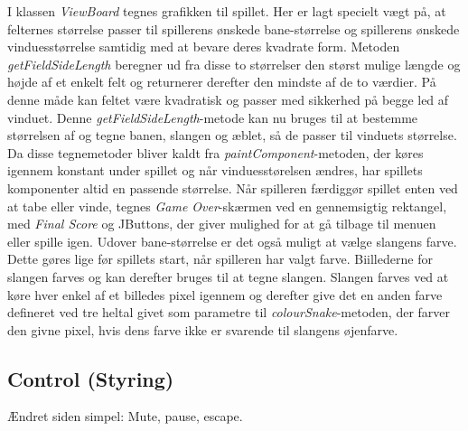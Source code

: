 \documentclass{report}
\begin{document}
I klassen \textit{ViewBoard} tegnes grafikken til spillet. Her er lagt specielt vægt på, at felternes størrelse passer til spillerens ønskede bane-størrelse og spillerens ønskede vinduesstørrelse samtidig med at bevare deres kvadrate form. Metoden \textit{getFieldSideLength} beregner ud fra disse to størrelser den størst mulige længde og højde af et enkelt felt og returnerer derefter den mindste af de to værdier. På denne måde kan feltet være kvadratisk og passer med sikkerhed på begge led af vinduet. Denne \textit{getFieldSideLength}-metode kan nu bruges til at bestemme størrelsen af og tegne banen, slangen og æblet, så de passer til vinduets størrelse. Da disse tegnemetoder bliver kaldt fra \textit{paintComponent}-metoden, der køres igennem konstant under spillet og når vinduesstørelsen ændres, har spillets komponenter altid en passende størrelse.
Når spilleren færdiggør spillet enten ved at tabe eller vinde, tegnes \textit{Game Over}-skærmen ved en gennemsigtig rektangel, med \textit{Final Score} og JButtons, der giver mulighed for at gå tilbage til menuen eller spille igen.
Udover bane-størrelse er det også muligt at vælge slangens farve. Dette gøres lige før spillets start, når spilleren har valgt farve. Biillederne for slangen farves og kan derefter bruges til at tegne slangen. Slangen farves ved at køre hver enkel af et billedes pixel igennem og derefter give det en anden farve defineret ved tre heltal givet som parametre til \textit{colourSnake}-metoden, der farver den givne pixel, hvis dens farve ikke er svarende til slangens øjenfarve.

\subsection{Control (Styring)}
Ændret siden simpel: Mute, pause, escape.
\end{document}
